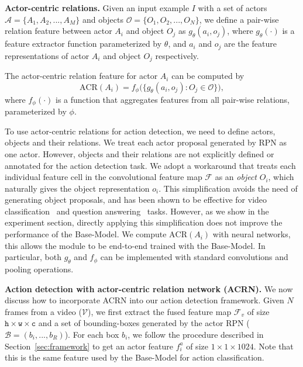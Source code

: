 \documentclass[runningheads]{llncs}
\begin{document}
\medskip\noindent\textbf{Actor-centric relations.} Given an input example $I$ with a set of actors $\mathcal{A} = \{A_1,A_2, ..., A_M\}$ and objects $\mathcal{O} = \{O_1,O_2, ..., O_N\}$, we define a pair-wise relation feature between actor $A_i$ and object $O_j$ as 
$g_\theta(a_i,o_j)$, where $g_\theta(\cdot)$ is a feature extractor function parameterized by $\theta$, and $a_i$ and $o_j$ are the feature representations of actor $A_i$ and object $O_j$ respectively.

The actor-centric relation feature for actor $A_i$ can be computed by
\begin{equation}
\text{ACR}(A_i) = f_\phi \bigg(\Big\{g_\theta(a_i,o_j): O_j \in \mathcal{O} \Big\} \bigg) ,
\end{equation}
where $f_\phi(\cdot)$ is a function that aggregates features from all pair-wise relations, parameterized by $\phi$.

To use actor-centric relations for action detection, we need to define actors, objects and their relations. We treat each actor proposal generated by RPN as one actor. However, objects and their relations are not explicitly defined or annotated for the action detection task. We adopt a workaround that treats each individual feature cell in the convolutional feature map $\mathcal{F}$ as an \textit{object} $O_i$, which naturally gives the object representation $o_i$. This simplification avoids the need of generating object proposals, and has been shown to be effective for video classification~\cite{non_local} and question answering~\cite{RN_deepmind17} tasks. However, as we show in the experiment section, directly applying this simplification does not improve the performance of the Base-Model. We compute $\text{ACR}(A_i)$ with neural networks, this allows the module to be end-to-end trained with the Base-Model. In particular, both $g_\theta$ and $f_\phi$ can be implemented with standard convolutions and pooling operations.

\medskip\noindent\textbf{Action detection with actor-centric relation network (ACRN).} We now discuss how to incorporate ACRN into our action detection framework. Given $N$ frames from a video ($\mathcal{V}$), we first extract the fused feature map $\mathcal{F}_v$ of size $\texttt{h}\times\texttt{w}\times\texttt{c}$ and a set of bounding-boxes generated by the actor RPN ($\mathcal{B} = (b_i, ..., b_R)$). For each box $b_i$, we follow the procedure described in Section~\ref{sec:framework} to get an actor feature $f^a_i$ of size $1\times1\times1024$. Note that this is the same feature used by the Base-Model for action classification.
\end{document}
